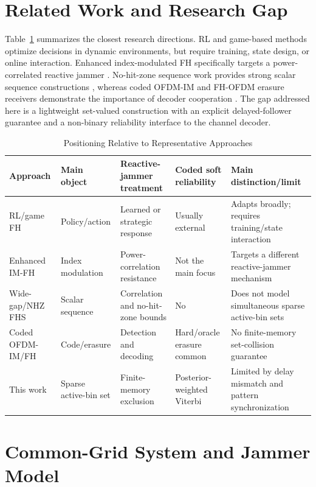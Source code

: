 \documentclass[journal,10pt]{IEEEtran}
\begin{document}
\section{Related Work and Research Gap}
Table~\ref{tab:related} summarizes the closest research directions. RL and
game-based methods optimize decisions in dynamic environments, but require
training, state design, or online interaction. Enhanced index-modulated FH
specifically targets a power-correlated reactive jammer
\cite{shi2022enhanced}. No-hit-zone sequence work provides strong scalar
sequence constructions \cite{zheng2025widegap}, whereas coded OFDM-IM and
FH-OFDM erasure receivers demonstrate the importance of decoder cooperation
\cite{kaplan2023,chen2023,mailaender2013}. The gap addressed here is a
lightweight set-valued construction with an explicit delayed-follower guarantee
and a non-binary reliability interface to the channel decoder.

\begin{table}[t]
\centering
\caption{Positioning Relative to Representative Approaches}
\label{tab:related}
\scriptsize
\setlength{\tabcolsep}{2.7pt}
\begin{tabular}{p{2.7cm}p{2.3cm}p{3.2cm}p{3.1cm}p{3.2cm}}
\toprule
Approach & Main object & Reactive-jammer treatment & Coded soft reliability & Main distinction/limit \\
\midrule
RL/game FH \cite{qi2024,zhang2024game,cheng2025} &
Policy/action & Learned or strategic response & Usually external &
Adapts broadly; requires training/state interaction \\
Enhanced IM-FH \cite{shi2022enhanced} &
Index modulation & Power-correlation resistance & Not the main focus &
Targets a different reactive-jammer mechanism \\
Wide-gap/NHZ FHS \cite{shu2024widegap,zheng2025widegap} &
Scalar sequence & Correlation and no-hit-zone bounds & No &
Does not model simultaneous sparse active-bin sets \\
Coded OFDM-IM/FH \cite{kaplan2023,chen2023,mailaender2013} &
Code/erasure & Detection and decoding & Hard/oracle erasure common &
No finite-memory set-collision guarantee \\
This work &
Sparse active-bin set & Finite-memory exclusion & Posterior-weighted Viterbi &
Limited by delay mismatch and pattern synchronization \\
\bottomrule
\end{tabular}
\end{table}

\section{Common-Grid System and Jammer Model}
\end{document}
